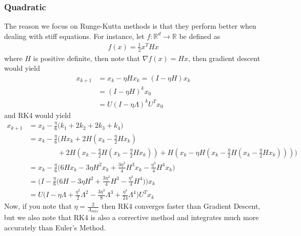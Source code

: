 


\subsubsection*{Quadratic}
The reason we focus on Runge-Kutta methods is that they perform better when dealing with stiff equations. For instance, let $f : \mathbb{R}^{d} \rightarrow \mathbb{R}$ be defined as
\begin{align*}
f(x) = \frac{1}{2} x^{T}H x  %
\end{align*}
where $H$ is positive definite, then note that $\nabla f(x) = Hx$, then gradient descent would yield
\begin{align*}
x_{k + 1} &= x_{k} - \eta H x_{k} = (I - \eta H) x_{k} \\
&= (I - \eta H)^{k} x_{0} \\
&= U (I - \eta \Lambda)^{k} U^{T} x_{0}
\end{align*}
and RK4 would yield
\begin{align*}
x_{k + 1} &= x_{k} - \frac{\eta}{6} \bigg( k_1 + 2 k_2 + 2 k_3 + k_4 \bigg) \\
&= x_k -  \frac{\eta}{6} \bigg( H x_k + 2 H (x_k - \frac{\eta}{2} H x_k ) \\
& \qquad \qquad + 2 H(x_k - \frac{\eta}{2} H (x_k - \frac{\eta}{2} H x_k )) + H(x_k - \eta H(x_k - \frac{\eta}{2} H (x_k - \frac{\eta}{2} H x_k )) ) \bigg) \\
&= x_k - \frac{\eta}{6} \bigg( 6 H x_k - 3 \eta H^{2} x_k + \frac{3 \eta^{2}}{4}H^{3}x_k - \frac{\eta^{3}}{4}H^{4} x_k  \bigg) \\
&= \bigg( I - \frac{\eta}{6} \big( 6 H - 3 \eta H^{2} + \frac{3 \eta^{2}}{4}H^{3} - \frac{\eta^{3}}{4}H^{4} \big) \bigg) x_k \\
&= U \bigg( I - \eta \Lambda +  \frac{\eta^{2}}{2} \Lambda^{2} - \frac{3 \eta^{3}}{8} \Lambda^{3} + \frac{\eta^{4}}{24} \Lambda^{4} \bigg) U^{T} x_k
\end{align*}
Now, if you note that $\eta=\frac{2}{\Lambda_{max}}$ then RK4 converges faster than Gradient Descent, but we also note that RK4 is also a corrective method and integrates much more accurately than Euler's Method.













